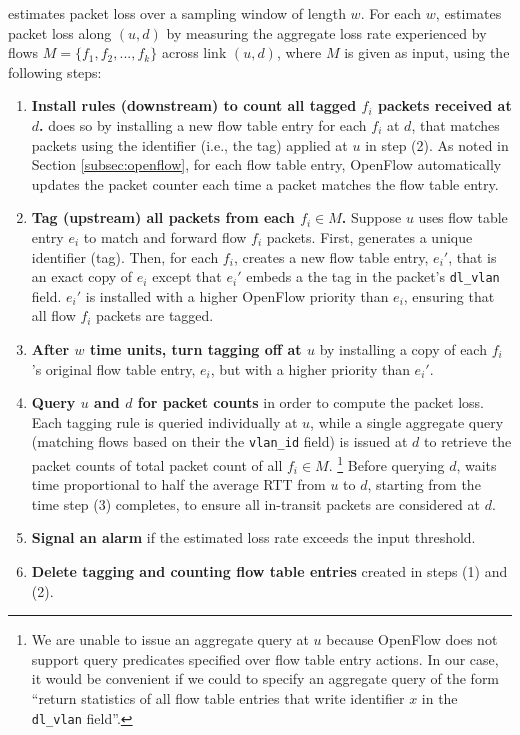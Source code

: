 \pcnt estimates packet loss over a sampling window of length $w$.  For each $w$, \pcnt estimates packet loss along $(u,d)$ by measuring the aggregate loss rate 
experienced by flows $M=\{f_1,f_2, ...,f_k\}$ across link $(u,d)$, where $M$ is given as input, using the following steps: 
\begin{enumerate}

	\item \textbf{Install rules (downstream) to count all tagged $f_i$ packets received at $d$.} \pcnt does so by installing a new flow table entry for each $f_i$ at $d$, 
	that matches packets using the identifier (i.e., the tag) applied at $u$ in step (2).  As noted in Section \ref{subsec:openflow}, for each flow table entry,
	OpenFlow automatically updates the packet counter each time a packet matches the flow table entry.
	
	
	\item \textbf{Tag (upstream) all packets from each $f_i \in M$.} Suppose $u$ uses flow table entry $e_i$ to match and forward flow $f_i$ packets. First, \pcnt generates
	a unique identifier (tag). Then, for each $f_i$, \pcnt creates a new flow table entry, $e_i'$, that is an exact copy of $e_i$ except that $e_i'$ embeds a the tag in the packet's 
	{\tt dl\_vlan} field. $e_i'$ is installed with a higher OpenFlow priority than $e_i$, ensuring that all flow $f_i$ packets are tagged.  


	\item \textbf{After $w$ time units, turn tagging off at $u$} by installing a copy of each $f_i$'s original flow table entry, $e_i$, but with a higher priority than $e_i'$.
	
	\item \textbf{Query $u$ and $d$ for packet counts} in order to compute the packet loss.  Each tagging rule is queried individually at $u$, while a single aggregate query (matching flows based
	on their the {\tt vlan\_id} field) is issued at $d$ to retrieve the packet counts of total packet count of all $f_i \in M$. 
	\footnote{We are unable to issue an aggregate query at $u$ because OpenFlow does not support query predicates specified over flow table entry actions.  In our case, it would be convenient if we could
	to specify an aggregate query of the form ``return statistics of all flow table entries that write identifier $x$ in the {\tt dl\_vlan} field''. }
	Before querying $d$, \pcnt waits time proportional to half the average RTT from $u$ to $d$, starting from the time step (3) completes, to ensure all in-transit packets are considered at $d$. 

	\item \textbf{Signal an alarm} if the estimated loss rate exceeds the input threshold.

	\item \textbf{Delete tagging and counting flow table entries} created in steps (1) and (2).
	
\end{enumerate}


